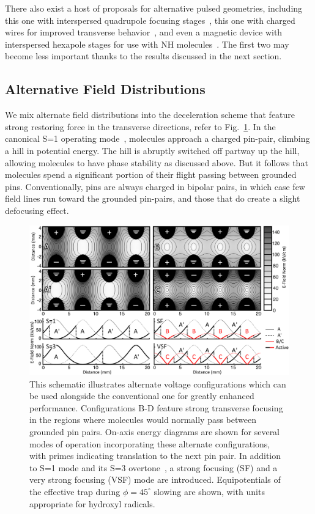 There also exist a host of proposals for alternative pulsed geometries, including this one with interspersed quadrupole focusing stages~\cite{Sawyer2008a}, this one with charged wires for improved transverse behavior~\cite{Wang2016}, and even a magnetic device with interspersed hexapole stages for use with NH molecules~\cite{Plomp2019}. The first two may become less important thanks to the results discussed in the next section.

\subsection{Alternative Field Distributions}

We mix alternate field distributions into the deceleration scheme that feature strong restoring force in the transverse directions, refer to Fig.~\ref{fig:chargecartoon}.
In the canonical S=1 operating mode~\cite{VanDeMeerakker2012}, molecules approach a charged pin-pair, climbing a hill in potential energy. 
The hill is abruptly switched off partway up the hill, allowing molecules to have phase stability as discussed above.
But it follows that molecules spend a significant portion of their flight passing between grounded pins.
Conventionally, pins are always charged in bipolar pairs, in which case few field lines run toward the grounded pin-pairs, and those that do create a slight defocusing effect. 

\begin{figure}[t!]
\includegraphics[width=\linewidth]{Slowing/pinpairformal.png}%
\caption{
This schematic illustrates alternate voltage configurations which can be used alongside the conventional one for greatly enhanced performance. Configurations B-D feature strong transverse focusing in the regions where molecules would normally pass between grounded pin pairs. On-axis energy diagrams are shown for several modes of operation incorporating these alternate configurations, with primes indicating translation to the next pin pair. In addition to S=1 mode and its S=3 overtone~\cite{VanDeMeerakker2005a}, a strong focusing (SF) and a very strong focusing (VSF) mode are introduced. Equipotentials of the effective trap during $\phi=45^\circ$ slowing are shown, with units appropriate for hydroxyl radicals.\vspace{-4mm}
}
\label{fig:chargecartoon}
\end{figure}


